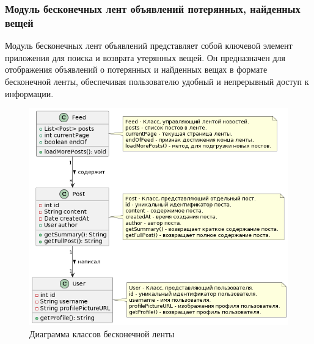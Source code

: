 \subsubsection{Модуль бесконечных лент объявлений потерянных, найденных вещей}

Модуль бесконечных лент объявлений представляет собой ключевой элемент приложения для поиска и возврата утерянных вещей. Он предназначен для отображения объявлений о потерянных и найденных вещах в формате бесконечной ленты, обеспечивая пользователю удобный и непрерывный доступ к информации.

\begin{figure}[htb]
	\centering
	\includegraphics[width=.9\textwidth]{images/feed-diagram.png}
	\parskip=6pt
	\caption{Диаграмма классов бесконечной ленты}
	\label{fig:feedDiagram}
\end{figure}

